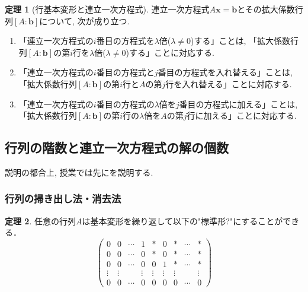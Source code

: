 \documentclass[dvipdfmx,a4paper,11pt]{article}
\theoremstyle{definition}
\newtheorem{thm}{定理}
\begin{document}
  
  
    \begin{tcolorbox}[
    colback = white,
    colframe = green!35!black,
    fonttitle = \bfseries,
    breakable = true]
    \begin{thm}[行基本変形と連立一次方程式]
連立一次方程式$A\bm{x}=\bm{b}$とその拡大係数行列$[A:\bm{b}]$について, 次が成り立つ.
 \begin{enumerate}
   \setlength{\parskip}{0cm} 
  \setlength{\itemsep}{0cm}
   \item 「連立一次方程式の$i$番目の方程式を$\lambda$倍($\lambda\neq 0$)する」ことは, 「拡大係数行列$[A:\bm{b}]$の第$i$行を$\lambda$倍($\lambda\neq 0$)する」ことに対応する. 
 \item 「連立一次方程式の$i$番目の方程式と$j$番目の方程式を入れ替える」ことは, 「拡大係数行列$[A:\bm{b}]$の第$i$行と$A$の第$j$行を入れ替える」ことに対応する. 
 \item 「連立一次方程式の$i$番目の方程式の$\lambda$倍を$j$番目の方程式に加える」ことは, 「拡大係数行列$[A:\bm{b}]$の第$i$行の$\lambda$倍を$A$の第$j$行に加える」ことに対応する. 
 \end{enumerate}
  \end{thm}
  \end{tcolorbox}

\subsection{行列の階数と連立一次方程式の解の個数\cite[2.6節]{M}}
\label{subsec-2.6}
説明の都合上, 授業では先に\cite[2.6節]{M}を説明する. 
\subsubsection{行列の掃き出し法・消去法}

 \begin{tcolorbox}[
    colback = white,
    colframe = green!35!black,
    fonttitle = \bfseries,
    breakable = true]
    \begin{thm}\cite[2.6節]{M}
   \label{thm-hyoujun}
    任意の行列$A$は基本変形を繰り返して以下の"標準形?"にすることができる．
    $$
    \begin{pmatrix}
0 & 0 & \cdots & 1 & \ast & 0 & \ast & \cdots & \ast \\
0 & 0 & \cdots & 0 & \ast& 0 & \ast& \cdots & \ast \\
0 & 0 & \cdots & 0 & 0 & 1 & \ast & \cdots & \ast \\
\vdots & \vdots & & \vdots & \vdots & \vdots & \vdots & & \vdots \\
0 & 0 & \cdots & 0 & 0 & 0 & 0 & \cdots & 0
\end{pmatrix}
$$
   \end{thm}
 \end{tcolorbox}
 
\end{document}
